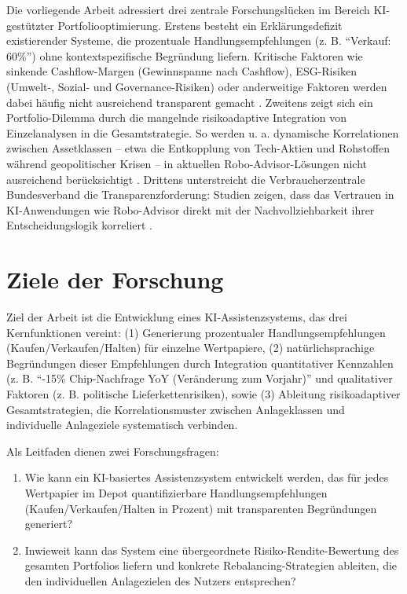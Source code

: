 Die vorliegende Arbeit adressiert drei zentrale Forschungslücken im Bereich \acs{KI}-gestützter Portfoliooptimierung.
Erstens besteht ein Erklärungsdefizit existierender Systeme, die prozentuale Handlungsempfehlungen (z. B. \enquote{Verkauf: 60\%}) ohne kontextspezifische Begründung liefern.
Kritische Faktoren wie sinkende Cashflow-Margen (Gewinnspanne nach Cashflow), \acs{ESG}-Risiken (Umwelt-, Sozial- und Governance-Risiken) oder anderweitige Faktoren werden dabei häufig nicht ausreichend transparent gemacht \autocite[S. 1917–1919]{demiguel2009}.
Zweitens zeigt sich ein Portfolio-Dilemma durch die mangelnde risikoadaptive Integration von Einzelanalysen in die Gesamtstrategie.
So werden u. a. dynamische Korrelationen zwischen Assetklassen -- etwa die Entkopplung von Tech-Aktien und Rohstoffen während geopolitischer Krisen -- in aktuellen Robo-Advisor-Lösungen nicht ausreichend berücksichtigt \autocite[S. 1138 und 1139]{ban2018}.
Drittens unterstreicht die Verbraucherzentrale Bundesverband die Transparenzforderung:
Studien zeigen, dass das Vertrauen in \acs{KI}-Anwendungen wie Robo-Advisor direkt mit der Nachvollziehbarkeit ihrer Entscheidungslogik korreliert \autocite{vzbv2018}.

\section{Ziele der Forschung}

Ziel der Arbeit ist die Entwicklung eines \acs{KI}-Assistenzsystems, das drei Kernfunktionen vereint:
(1) Generierung prozentualer Handlungsempfehlungen (Kaufen/Verkaufen/Halten) für einzelne Wertpapiere, (2) natürlichsprachige Begründungen dieser Empfehlungen durch Integration quantitativer Kennzahlen (z. B. \enquote{-15\% Chip-Nachfrage \acs{YoY} (Veränderung zum Vorjahr)} und qualitativer Faktoren (z. B. politische Lieferkettenrisiken), sowie (3) Ableitung risikoadaptiver Gesamtstrategien, die Korrelationsmuster zwischen Anlageklassen und individuelle Anlageziele systematisch verbinden.

Als Leitfaden dienen zwei Forschungsfragen:
\begin{enumerate}
    \item Wie kann ein \acs{KI}-basiertes Assistenzsystem entwickelt werden, das für jedes Wertpapier im Depot quantifizierbare Handlungsempfehlungen (Kaufen/Verkaufen/Halten in Prozent) mit transparenten Begründungen generiert?
    \item Inwieweit kann das System eine übergeordnete Risiko-Rendite-Bewertung des gesamten Portfolios liefern und konkrete Rebalancing-Strategien ableiten, die den individuellen Anlagezielen des Nutzers entsprechen?
\end{enumerate}

